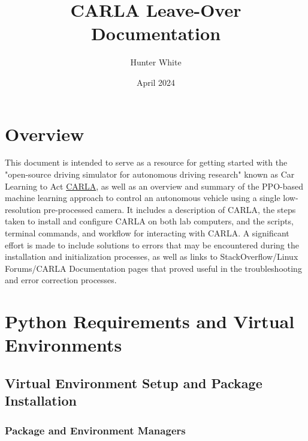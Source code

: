 \documentclass[12pt,oneside,letterpaper]{article}
\title{CARLA Leave-Over Documentation}
\author{Hunter White}
\date{April 2024}
\begin{document}
\maketitle
\newpage
\tableofcontents
\newpage


\section{Overview}
\label{sec:Overview}
This document is intended to serve as a resource for getting started with the "open-source driving simulator for autonomous driving research" known as Car Learning to Act \href{https://carla.org/}{CARLA}, as well as an overview and summary of the PPO-based machine learning approach to control an autonomous vehicle using a single low-resolution pre-processed camera. It includes a description of CARLA, the steps taken to install and configure CARLA on both lab computers, and the scripts, terminal commands, and workflow for interacting with CARLA. A significant effort is made to include solutions to errors that may be encountered during the installation and initialization processes, as well as links to StackOverflow/Linux Forums/CARLA Documentation pages that proved useful in the troubleshooting and error correction processes.

\section{Python Requirements and Virtual Environments}
\subsection{Virtual Environment Setup and Package Installation}
\subsubsection{Package and Environment Managers}
\label{subsec: Environment Managers}
\end{document}
